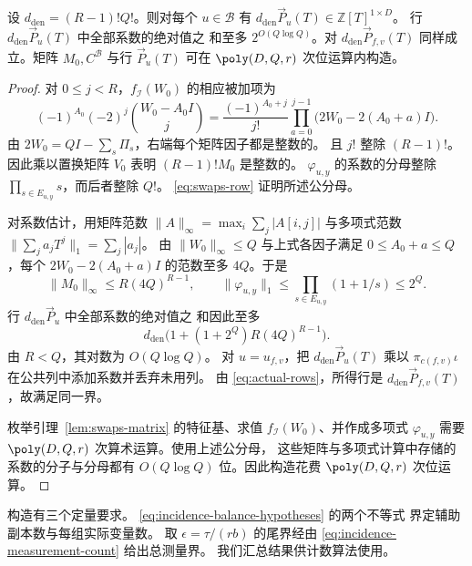 \begin{lemma}\label{lem:row-coefficients}
设 $d_{\mathrm{den}}=(R-1)!Q!$。则对每个 $u\in\mathcal B$
有 $d_{\mathrm{den}}\vec{P}_u(T)\in\mathbb Z[T]^{1\times D}$。
行 $d_{\mathrm{den}}\vec{P}_u(T)$ 中全部系数的绝对值之
和至多 $2^{O(Q\log Q)}$。对 $d_{\mathrm{den}}\vec{P}_{f,v}(T)$
同样成立。矩阵 $M_0,C^{\mathcal B}$ 与行 $\vec{P}_u(T)$
可在 $\poly(D,Q,r)$ 次位运算内构造。
\end{lemma}
\begin{proof}
对 $0\le j<R$，$f_{\mathcal I}(W_0)$ 的相应被加项为
\[
 (-1)^{A_0}(-2)^j\binom{W_0-A_0I}{j}
 =\frac{(-1)^{A_0+j}}{j!}
   \prod_{a=0}^{j-1}\bigl(2W_0-2(A_0+a)I\bigr).
\]
由 $2W_0=QI-\sum_s\Pi_s$，右端每个矩阵因子都是整数的。
且 $j!$ 整除 $(R-1)!$。
因此乘以置换矩阵 $V_0$ 表明 $(R-1)!M_0$ 是整数的。
$\varphi_{u,y}$ 的系数的分母整除
$\prod_{s\in E_{u,y}}s$，而后者整除 $Q!$。
\eqref{eq:swaps-row} 证明所述公分母。

对系数估计，用矩阵范数
$\|A\|_\infty=\max_i\sum_j|A[i,j]|$
与多项式范数 $\|\sum_j a_jT^j\|_1=\sum_j|a_j|$。
由 $\|W_0\|_\infty\le Q$ 与上式各因子满足
$0\le A_0+a\le Q$，每个 $2W_0-2(A_0+a)I$
的范数至多 $4Q$。于是
\[
 \|M_0\|_\infty\le R(4Q)^{R-1},\qquad
 \|\varphi_{u,y}\|_1
 \le\prod_{s\in E_{u,y}}(1+1/s)\le2^Q.
\]
行 $d_{\mathrm{den}}\vec{P}_u$ 中全部系数的绝对值之
和因此至多
\[
 d_{\mathrm{den}}\bigl(1+(1+2^Q)R(4Q)^{R-1}\bigr).
\]
由 $R<Q$，其对数为 $O(Q\log Q)$。
对 $u=u_{f,v}$，把 $d_{\mathrm{den}}\vec{P}_u(T)$
乘以 $\pi_{c(f,v)}\iota$ 在公共列中添加系数并丢弃未用列。
由 \eqref{eq:actual-rows}，所得行是
$d_{\mathrm{den}}\vec{P}_{f,v}(T)$，故满足同一界。

枚举引理~\ref{lem:swaps-matrix} 的特征基、求值
$f_{\mathcal I}(W_0)$、并作成多项式 $\varphi_{u,y}$
需要 $\poly(D,Q,r)$ 次算术运算。使用上述公分母，
这些矩阵与多项式计算中存储的系数的分子与分母都有
$O(Q\log Q)$ 位。因此构造花费 $\poly(D,Q,r)$
次位运算。
\end{proof}

构造有三个定量要求。
\eqref{eq:incidence-balance-hypotheses} 的两个不等式
界定辅助副本数与每组实际变量数。
取 $\epsilon=\tau/(rb)$ 的尾界经由
\eqref{eq:incidence-measurement-count} 给出总测量界。
我们汇总结果供计数算法使用。

